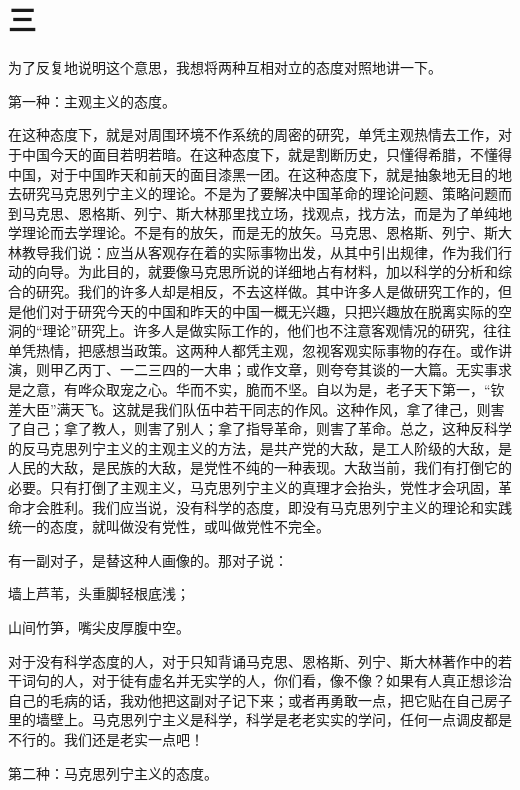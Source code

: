 \section*{三}

为了反复地说明这个意思，我想将两种互相对立的态度对照地讲一下。

第一种：主观主义的态度。

在这种态度下，就是对周围环境不作系统的周密的研究，单凭主观热情去工作，对于中国今天的面目若明若暗。在这种态度下，就是割断历史，只懂得希腊，不懂得中国，对于中国昨天和前天的面目漆黑一团。在这种态度下，就是抽象地无目的地去研究马克思列宁主义的理论。不是为了要解决中国革命的理论问题、策略问题而到马克思、恩格斯、列宁、斯大林那里找立场，找观点，找方法，而是为了单纯地学理论而去学理论。不是有的放矢，而是无的放矢。马克思、恩格斯、列宁、斯大林教导我们说：应当从客观存在着的实际事物出发，从其中引出规律，作为我们行动的向导。为此目的，就要像马克思所说的详细地占有材料，加以科学的分析和综合的研究。我们的许多人却是相反，不去这样做。其中许多人是做研究工作的，但是他们对于研究今天的中国和昨天的中国一概无兴趣，只把兴趣放在脱离实际的空洞的“理论”研究上。许多人是做实际工作的，他们也不注意客观情况的研究，往往单凭热情，把感想当政策。这两种人都凭主观，忽视客观实际事物的存在。或作讲演，则甲乙丙丁、一二三四的一大串；或作文章，则夸夸其谈的一大篇。无实事求是之意，有哗众取宠之心。华而不实，脆而不坚。自以为是，老子天下第一，“钦差大臣”满天飞。这就是我们队伍中若干同志的作风。这种作风，拿了律己，则害了自己；拿了教人，则害了别人；拿了指导革命，则害了革命。总之，这种反科学的反马克思列宁主义的主观主义的方法，是共产党的大敌，是工人阶级的大敌，是人民的大敌，是民族的大敌，是党性不纯的一种表现。大敌当前，我们有打倒它的必要。只有打倒了主观主义，马克思列宁主义的真理才会抬头，党性才会巩固，革命才会胜利。我们应当说，没有科学的态度，即没有马克思列宁主义的理论和实践统一的态度，就叫做没有党性，或叫做党性不完全。

有一副对子，是替这种人画像的。那对子说：

墙上芦苇，头重脚轻根底浅；

山间竹笋，嘴尖皮厚腹中空。

对于没有科学态度的人，对于只知背诵马克思、恩格斯、列宁、斯大林著作中的若干词句的人，对于徒有虚名并无实学的人，你们看，像不像？如果有人真正想诊治自己的毛病的话，我劝他把这副对子记下来；或者再勇敢一点，把它贴在自己房子里的墙壁上。马克思列宁主义是科学，科学是老老实实的学问，任何一点调皮都是不行的。我们还是老实一点吧！

第二种：马克思列宁主义的态度。

